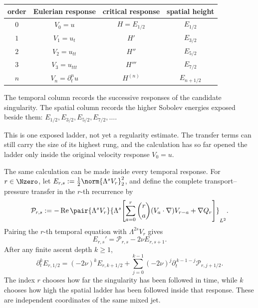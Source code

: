 \begin{center}
\captionsetup{hypcap=false}
\label{tab:BodyTemporalSpatialDiscovery}
\small
\renewcommand{\arraystretch}{1.2}
\begin{tabular}{@{}c c c c@{}}
\toprule
order & Eulerian response & critical response & spatial height \\
\midrule
\(0\) & \(V_0=u\) & \(H=E_{1/2}\) & \(E_{1/2}\) \\
\(1\) & \(V_1=u_t\) & \(H'\) & \(E_{3/2}\) \\
\(2\) & \(V_2=u_{tt}\) & \(H''\) & \(E_{5/2}\) \\
\(3\) & \(V_3=u_{ttt}\) & \(H'''\) & \(E_{7/2}\) \\
\(n\) & \(V_n=\partial_t^nu\) & \(H^{(n)}\) & \(E_{n+1/2}\) \\
\bottomrule
\end{tabular}
\end{center}

The temporal column records the successive responses of the candidate singularity.
The spatial column records the higher Sobolev energies exposed beside them:
\(E_{1/2},E_{3/2},E_{5/2},E_{7/2},\ldots\).

This is one exposed ladder, not yet a regularity estimate.
The transfer terms can still carry the size of its highest rung, and the calculation has so far opened the ladder only inside the original velocity response \(V_0=u\).

The same calculation can be made inside every temporal response.
For \(r\in\Nzero\), let \(E_{r,s}:=\tfrac12\norm{\Lambda^sV_r}_2^2\), and define the complete transport--pressure transfer in the \(r\)-th recurrence by
\[
  \mathcal P_{r,s}
  :=-
  \operatorname{Re}
  \pair{\Lambda^sV_r}
  {\Lambda^s\!\left[
    \sum_{a=0}^{r}\binom{r}{a}(V_a\cdot\nabla)V_{r-a}
    +\nabla Q_r
  \right]}_{L^2}.
\]
Pairing the \(r\)-th temporal equation with \(\Lambda^{2s}V_r\) gives
\begin{equation}\label{eq:BodyEveryTemporalRowSpatialEnergy}
  E_{r,s}'=\mathcal P_{r,s}-2\nu E_{r,s+1}.
\end{equation}
After any finite ascent depth \(k\geq1\),
\begin{equation}\label{eq:BodyEveryTemporalRowCompletedHeight}
  \partial_t^kE_{r,1/2}
  =(-2\nu)^kE_{r,k+1/2}
  +\sum_{j=0}^{k-1}
  (-2\nu)^j
  \partial_t^{\,k-1-j}\mathcal P_{r,j+1/2}.
\end{equation}
The index \(r\) chooses how far the singularity has been followed in time, while \(k\) chooses how high the spatial ladder has been followed inside that response.
These are independent coordinates of the same mixed jet.


